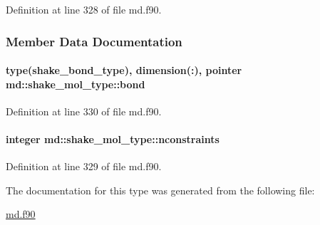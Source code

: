 Definition at line 328 of file md.\-f90.



\subsubsection{Member Data Documentation}
\hypertarget{structmd_1_1shake__mol__type_ad29ab1345861fdf94b3f776eb46a5478}{
\paragraph[{bond}]{\setlength{\rightskip}{0pt plus 5cm}type({\bf shake\-\_\-bond\-\_\-type}), dimension(\-:), pointer md\-::shake\-\_\-mol\-\_\-type\-::bond}}\label{structmd_1_1shake__mol__type_ad29ab1345861fdf94b3f776eb46a5478}


Definition at line 330 of file md.\-f90.

\hypertarget{structmd_1_1shake__mol__type_ae21a429532ad510859b583b27f3a6b14}{
\paragraph[{nconstraints}]{\setlength{\rightskip}{0pt plus 5cm}integer md\-::shake\-\_\-mol\-\_\-type\-::nconstraints}}\label{structmd_1_1shake__mol__type_ae21a429532ad510859b583b27f3a6b14}


Definition at line 329 of file md.\-f90.



The documentation for this type was generated from the following file\-:\begin{DoxyCompactItemize}
\item 
\hyperlink{md_8f90}{md.\-f90}\end{DoxyCompactItemize}
